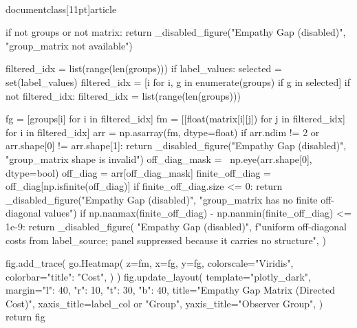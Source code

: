 \\documentclass[11pt]{article}
\begin{document}
\begin{CodeBlock}
{{{{{{{{    if not groups or not matrix:
        return _disabled_figure("Empathy Gap (disabled)", "group_matrix not available")

    filtered_idx = list(range(len(groups)))
    if label_values:
        selected = set(label_values)
        filtered_idx = [i for i, g in enumerate(groups) if g in selected]
        if not filtered_idx:
            filtered_idx = list(range(len(groups)))

    fg = [groups[i] for i in filtered_idx]
    fm = [[float(matrix[i][j]) for j in filtered_idx] for i in filtered_idx]
    arr = np.asarray(fm, dtype=float)
    if arr.ndim != 2 or arr.shape[0] != arr.shape[1]:
        return _disabled_figure("Empathy Gap (disabled)", "group_matrix shape is invalid")
    off_diag_mask = ~np.eye(arr.shape[0], dtype=bool)
    off_diag = arr[off_diag_mask]
    finite_off_diag = off_diag[np.isfinite(off_diag)]
    if finite_off_diag.size <= 0:
        return _disabled_figure("Empathy Gap (disabled)", "group_matrix has no finite off-diagonal values")
    if np.nanmax(finite_off_diag) - np.nanmin(finite_off_diag) <= 1e-9:
        return _disabled_figure(
            "Empathy Gap (disabled)",
            f"uniform off-diagonal costs from {label_source}; panel suppressed because it carries no structure",
        )

    fig.add_trace(
        go.Heatmap(
            z=fm,
            x=fg,
            y=fg,
            colorscale="Viridis",
            colorbar={"title": "Cost"},
        )
    )
    fig.update_layout(
        template="plotly_dark",
        margin={"l": 40, "r": 10, "t": 30, "b": 40},
        title="Empathy Gap Matrix (Directed Cost)",
        xaxis_title=label_col or "Group",
        yaxis_title="Observer Group",
    )
    return fig


}}}}}}}}
\end{CodeBlock}
\end{document}
